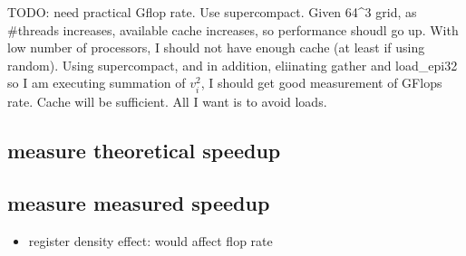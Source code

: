 TODO: need practical Gflop rate.
Use supercompact. Given 64^3 grid, as #threads increases, available cache increases, so performance shoudl go up. With low number of processors, 
I should not have enough cache (at least if using random). Using supercompact, and in addition, eliinating gather and load_epi32 so I am executing 
summation of $v_i^2$, I should get good measurement of GFlops rate. Cache will be sufficient. All I want is to avoid loads. 

\subsection{measure theoretical speedup}
\subsection{measure measured speedup}
\begin{itemize}
\item register density effect: would affect flop rate
\end{itemize}
